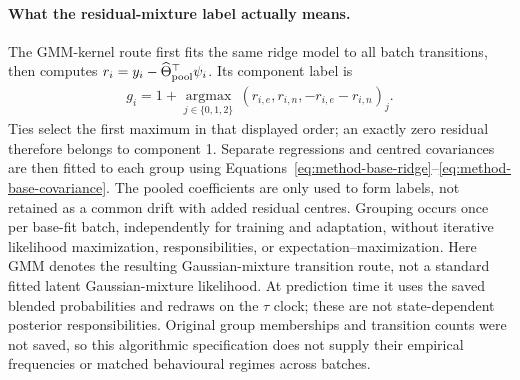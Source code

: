 \documentclass[11pt]{article}
\begin{document}
\paragraph{What the residual-mixture label actually means.}
\label{sec:residual-mixture-fit}
The GMM-kernel route first fits the same ridge model to all batch transitions,
then computes \(r_i=y_i-\widehat\Theta_{\rm pool}^\top\psi_i\). Its component
label is
\begin{align}
 g_i=1+\underset{j\in\{0,1,2\}}{\operatorname{argmax}}\,
       (r_{i,e},r_{i,n},-r_{i,e}-r_{i,n})_j .
 \label{eq:gmm-residual-partition}
\end{align}
Ties select the first maximum in that displayed order; an exactly zero
residual therefore belongs to component 1. Separate regressions and centred
covariances are then fitted to each group using
Equations~\eqref{eq:method-base-ridge}--\eqref{eq:method-base-covariance}.
The pooled coefficients are only used to form labels, not retained as a
common drift with added residual centres. Grouping occurs once per base-fit
batch, independently for training and adaptation, without iterative
likelihood maximization, responsibilities, or expectation--maximization.
Here GMM denotes the resulting Gaussian-mixture transition route, not a
standard fitted latent Gaussian-mixture likelihood. At prediction time it
uses the saved blended probabilities and redraws on the \(\tau\) clock;
these are not state-dependent posterior responsibilities. Original group
memberships and transition counts were not saved, so this algorithmic
specification does not supply their empirical frequencies or matched
behavioural regimes across batches.
\end{document}
